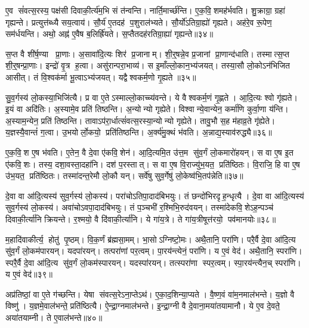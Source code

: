 ए॒व सं॑वत्स॒रस्य॒ पक्ष॑सी दिवाकी॒र्त्य॑म॒भि सं त॑न्वन्ति।
नार्ति॒मार्च्छ॑न्ति।
ए॒क॒वि॒शमह॑र्भवति।
शु॒क्राग्रा॒ ग्रहा॑ गृह्यन्ते।
प्रत्युत्त॑ब्ध्यै सय॒त्वाय॑।
सौ॒र्य॑ ए॒तदह॑ प॒शुराल॑भ्यते।
सौ॒र्यो॑ऽतिग्रा॒ह्यो॑ गृह्यते।
अह॑रे॒व रू॒पेण॒ सम॑र्धयन्ति।
अथो॒ अह्न॑ ए॒वैष ब॒लिर्ह्रि॑यते।
स॒प्तैतदह॑रतिग्रा॒ह्या॑ गृह्यन्ते॥३४॥

स॒प्त वै शी॑र्\mbox{}ष॒ण्या प्रा॒णाः।
अ॒सावा॑दि॒त्यः शिर॑ प्र॒जानाम्।
शी॒र्॒षन्ने॒व प्र॒जानां प्रा॒णान्द॑धाति।
तस्मात्स॒प्त शी॒र्॒षन्प्रा॒णाः।
इन्द्रो॑ वृ॒त्र ह॒त्वा।
असु॑रान्परा॒भाव्य॑।
स इ॒माँल्लो॒कान॒भ्य॑जयत्।
तस्या॒सौ लो॒कोऽन॑भिजित आसीत्।
तं वि॒श्वक॑र्मा भू॒त्वाऽभ्य॑जयत्।
यद्वैश्वकर्म॒णो गृ॒ह्यते॥३५॥

सु॒व॒र्गस्य॑ लो॒कस्या॒भिजि॑त्यै।
प्र वा ए॒तेऽस्माल्लो॒काच्च्य॑वन्ते।
ये वैश्वकर्म॒णं गृ॒ह्णते।
आ॒दि॒त्यः श्वो गृ॑ह्यते।
इ॒यं वा अदि॑तिः।
अ॒स्यामे॒व प्रति॑ तिष्ठन्ति।
अ॒न्योन्यो गृह्येते।
विश्वान्ये॒वान्येन॒ कर्मा॑णि कुर्वा॒णा य॑न्ति।
अ॒स्याम॒न्येन॒ प्रति॑ तिष्ठन्ति।
तावाऽप॑रा॒र्धात्सं॑वत्स॒रस्या॒न्योन्यो गृह्येते।
तावु॒भौ स॒ह म॑हाव्र॒ते गृ॑ह्येते।
य॒ज्ञस्यै॒वान्तं॑ ग॒त्वा।
उ॒भयोर्लो॒कयो॒ प्रति॑तिष्ठन्ति।
अ॒र्क्य॑मु॒क्थं भ॑वति।
अ॒न्नाद्य॒स्याव॑रुद्ध्यै॥३६॥\anuvakamend[स॒मा॒यच्छ॑त्यतिग्रा॒ह्या॑ गृह्यन्ते गृ॒ह्यते॑ संवत्स॒रस्या॒न्योन्यो गृह्येते॒ पञ्च॑ च]

ए॒क॒वि॒श ए॒ष भ॑वति।
ए॒तेन॒ वै दे॒वा ए॑कवि॒शेन॑।
आ॒दि॒त्यमि॒त उ॑त्त॒म सु॑व॒र्गं लो॒कमारो॑हयन्।
स वा ए॒ष इ॒त ए॑कवि॒शः।
तस्य॒ दशा॒वस्ता॒दहा॑नि।
दश॑ प॒रस्तात्।
स वा ए॒ष वि॒राज्यु॑भ॒यत॒ प्रति॑ष्ठितः।
वि॒राजि॒ हि वा ए॒ष उ॑भ॒यत॒ प्रति॑ष्ठितः।
तस्मा॑दन्त॒रेमौ लो॒कौ यन्।
सर्वे॑षु सुव॒र्गेषु॑ लो॒केष्व॑भि॒तप॑न्नेति॥३७॥

दे॒वा वा आ॑दि॒त्यस्य॑ सुव॒र्गस्य॑ लो॒कस्य॑।
परा॑चोऽतिपा॒दा\-द॑बिभयुः।
तं छन्दो॑भिरदृह॒न्धृत्यै।
दे॒वा वा आ॑दि॒त्यस्य॑ सुव॒र्गस्य॑ लो॒कस्य॑।
अवा॑चोऽवपा॒दाद॑बिभयुः।
तं प॒ञ्चभी॑ र॒श्मिभि॒रुद॑वयन्।
तस्मा॑देकवि॒शेऽह॒न्पञ्च॑ दिवाकी॒र्त्या॑नि क्रियन्ते।
र॒श्मयो॒ वै दि॑वाकी॒र्त्या॑नि।
ये गा॑य॒त्रे।
ते गा॑य॒त्रीषूत्त॑रयो॒ पव॑मानयोः॥३८॥

म॒हादि॑वाकीर्त्य॒ होतु॑ पृ॒ष्ठम्।
वि॒क॒र्णं ब्र॑ह्मसा॒मम्।
भा॒सोऽग्निष्टो॒मः।
अथै॒तानि॒ परा॑णि।
परै॒र्वै दे॒वा आ॑दि॒त्य सु॑व॒र्गं लो॒कम॑पारयन्।
यदपा॑रयन्।
तत्परा॑णां पर॒त्वम्।
पा॒रय॑न्त्येनं॒ परा॑णि।
य ए॒वं वेद॑।
अथै॒तानि॒ स्परा॑णि।
स्परै॒र्वै दे॒वा आ॑दि॒त्य सु॑व॒र्गं लो॒कम॑स्पारयन्।
यदस्पा॑रयन्।
तत्स्परा॑णा स्पर॒त्वम्।
स्पा॒रय॑न्त्यैन॒च् स्परा॑णि।
य ए॒वं वेद॑॥३९॥\anuvakamend[ए॒ति॒ पव॑मानयो॒ स्परा॑णि॒ पञ्च॑ च]

अप्र॑तिष्ठां॒ वा ए॒ते ग॑च्छन्ति।
येषा संवत्स॒रेऽना॒प्तेऽथ॑।
ए॒का॒द॒शिन्या॒प्यते।
वै॒ष्ण॒वं वा॑म॒नमाल॑भन्ते।
य॒ज्ञो वै विष्णु॑।
य॒ज्ञमे॒वाल॑भन्ते॒ प्रति॑ष्ठित्यै।
ऐ॒न्द्रा॒ग्नमाल॑भन्ते।
इ॒न्द्रा॒ग्नी वै दे॒वाना॒मया॑तयामानौ।
ये ए॒व दे॒वते॒ अया॑तयाम्नी।
ते ए॒वाल॑भन्ते॥४०॥

